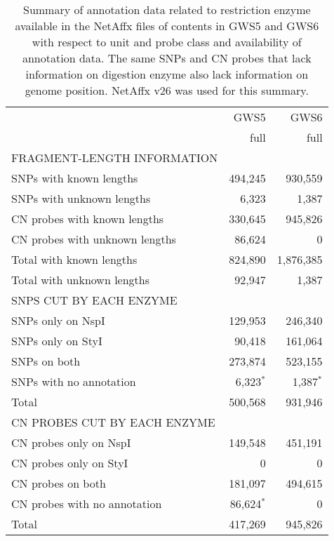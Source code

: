 \documentclass[10pt,a4paper]{article}
\newcommand{\GWSFive}{GWS5\xspace}
\newcommand{\GWSSix}{GWS6\xspace}
\begin{document}
\begin{table}[htp]
\begin{center}
\begin{tabular}{lrr}
                        &  \GWSFive &   \GWSSix \\
                        &  full     &   full    \\
\hline
FRAGMENT-LENGTH INFORMATION    	&	  				&	 				  \\
SNPs with known lengths         &  494,245  &   930,559 \\
SNPs with unknown lengths       &    6,323  &     1,387 \\
CN probes with known lengths    &  330,645  &   945,826 \\
CN probes with unknown lengths  &   86,624  &         0 \\
Total with known lengths        &  824,890  & 1,876,385 \\
Total with unknown lengths      &   92,947  &     1,387 \\
\hline
SNPS CUT BY EACH ENZYME      & 	  			&	 				  \\
SNPs only on NspI            &  129,953  &   246,340 \\
SNPs only on StyI            &   90,418  &   161,064 \\
SNPs on both                 &  273,874  &   523,155 \\
SNPs with no annotation      &    6,323\parbox{0mm}{$^*$}  &     1,387\parbox{0mm}{$^*$} \\
Total                        &  500,568  &   931,946 \\
\hline
CN PROBES CUT BY EACH ENZYME & 	  			&	 				  \\
CN probes only on NspI       &  149,548  &   451,191 \\
CN probes only on StyI       &        0  &         0 \\
CN probes on both            &  181,097  &   494,615 \\
CN probes with no annotation &   86,624\parbox{0mm}{$^*$}  &         0 \\
Total                        &  417,269  &   945,826 \\
\hline
\end{tabular}
\end{center}
\caption{Summary of annotation data related to restriction enzyme available in the NetAffx files of contents in \GWSFive and \GWSSix with respect to unit and probe class and availability of annotation data.  The same SNPs and CN probes that lack information on digestion enzyme also lack information on genome position.  NetAffx v26 was used for this summary.}
\label{tblEnzymeData}
\end{table}
\end{document}
